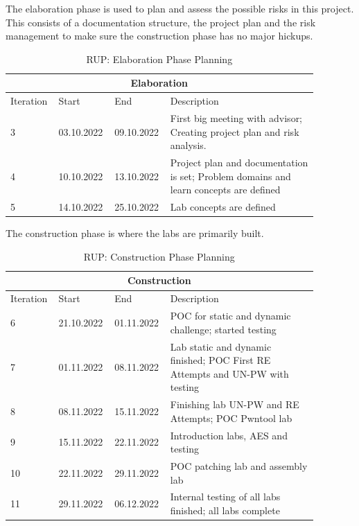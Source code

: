 \noindent The elaboration phase is used to plan and assess the possible risks in this project. This consists of a documentation structure, the project plan and the risk management to make sure the construction phase has no major hickups.
\begin{table}[H]
    \centering
    \begin{tabular}{|p{0.12\linewidth}|p{0.15\linewidth}|p{0.15\linewidth}|p{0.46\linewidth}|}
        \hline
        \multicolumn{4}{||c||}{\textbf{Elaboration}} \\
        \hline \hline
        Iteration & Start & End & Description \\
        \hline \hline
        3 & 03.10.2022 & 09.10.2022 & First big meeting with advisor; Creating project plan and risk analysis.\\
        \hline
        4 & 10.10.2022 & 13.10.2022 & Project plan and documentation is set; Problem domains and learn concepts are defined \\
        \hline
        5 & 14.10.2022 & 25.10.2022 & Lab concepts are defined \\
        \hline
    \end{tabular}
    \caption{RUP: Elaboration Phase Planning}
    \label{elaboration_table}
\end{table}

\newpage
\noindent The construction phase is where the labs are primarily built. 
\begin{table}[H]
    \centering
    \begin{tabular}{|p{0.12\linewidth}|p{0.15\linewidth}|p{0.15\linewidth}|p{0.46\linewidth}|}
        \hline
        \multicolumn{4}{||c||}{\textbf{Construction}} \\
        \hline \hline
        Iteration & Start & End & Description \\
        \hline \hline
        6 & 21.10.2022 & 01.11.2022 & POC for static and dynamic challenge; started testing \\
        \hline
        7 & 01.11.2022 & 08.11.2022 & Lab static and dynamic finished; POC First RE Attempts and UN-PW with testing \\
        \hline
        8 & 08.11.2022 & 15.11.2022 & Finishing lab UN-PW and RE Attempts; POC Pwntool lab \\
        \hline
        9 & 15.11.2022 & 22.11.2022 & Introduction labs, AES and testing \\
        \hline
        10 & 22.11.2022 & 29.11.2022 & POC patching lab and assembly lab \\
        \hline
        11 & 29.11.2022 & 06.12.2022 & Internal testing of all labs finished; all labs complete\\
        \hline
    \end{tabular}
    \caption{RUP: Construction Phase Planning}
    \label{construction_table}
\end{table}

